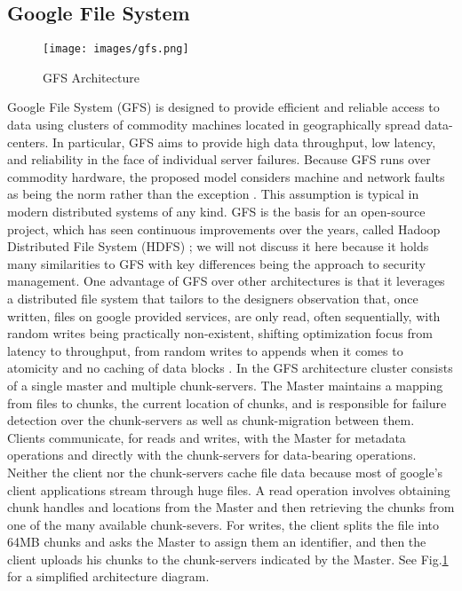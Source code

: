 \documentclass[runningheads]{llncs}
\begin{document}
\subsection{Google File System}

\begin{figure}[t]
\centering
\texttt{[image: images/gfs.png]}
\caption{GFS Architecture}\label{fig:gfs_arch}
\end{figure}

Google File System (GFS) \cite{gfs} is designed to provide efficient and reliable access to data using clusters of commodity machines located in geographically spread data-centers. In particular, GFS aims to provide high data throughput, low latency, and reliability in the face of individual server failures. Because GFS runs over commodity hardware, the proposed model considers machine and network faults as being the norm rather than the exception \cite{gfs}.  This assumption is typical in modern distributed systems of any kind. GFS is the basis for an open-source project, which has seen continuous improvements over the years, called Hadoop Distributed File System (HDFS) \cite{hadoop}; we will not discuss it here because it holds many similarities to GFS with key differences being the approach to security management. One advantage of GFS over other architectures is that it leverages a distributed file system that tailors to the designers observation that, once written, files on google provided services, are only read, often sequentially, with random writes being practically non-existent, shifting optimization focus from latency to throughput, from random writes to appends when it comes to atomicity and no caching of data blocks \cite{gfs}. In the GFS architecture cluster consists of a single master and multiple chunk-servers. The Master maintains a mapping from files to chunks, the current location of chunks, and is responsible for failure detection over the chunk-servers as well as chunk-migration between them. Clients communicate, for reads and writes, with the Master for metadata operations and directly with the chunk-servers for data-bearing operations. Neither the client nor the chunk-servers cache file data because most of google's client applications stream through huge files. A read operation involves obtaining chunk handles and locations from the Master and then retrieving the chunks from one of the many available chunk-severs. For writes, the client splits the file into 64MB chunks and asks the Master to assign them an identifier, and then the client uploads his chunks to the chunk-servers indicated by the Master. See Fig.\ref{fig:gfs_arch} for a simplified architecture diagram.
\end{document}
